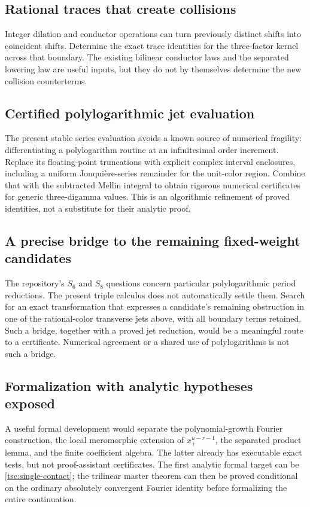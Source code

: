\documentclass[11pt]{article}
\numberwithin{equation}{section}
\theoremstyle{definition}\newtheorem{definition}[theorem]{Definition}
\theoremstyle{remark}\newtheorem{remark}[theorem]{Remark}
\begin{document}
\subsection{Rational traces that create collisions}
Integer dilation and conductor operations can turn previously distinct
shifts into coincident shifts. Determine the exact trace identities for
the three-factor kernel across that boundary. The existing bilinear
conductor laws and the separated lowering law are useful inputs, but they
do not by themselves determine the new collision counterterms.

\subsection{Certified polylogarithmic jet evaluation}
The present stable series evaluation avoids a known source of numerical
fragility: differentiating a polylogarithm routine at an infinitesimal
order increment. Replace its floating-point truncations with explicit
complex interval enclosures, including a uniform Jonqui\`ere-series
remainder for the unit-color region. Combine that with the subtracted
Mellin integral to obtain rigorous numerical certificates for generic
three-digamma values. This is an algorithmic refinement of proved
identities, not a substitute for their analytic proof.

\subsection{A precise bridge to the remaining fixed-weight candidates}
The repository's $S_6$ and $S_8$ questions concern particular polylogarithmic
period reductions. The present triple calculus does not automatically
settle them. Search for an exact transformation that expresses a candidate's
remaining obstruction in one of the rational-color transverse jets above,
with all boundary terms retained. Such a bridge, together with a proved
jet reduction, would be a meaningful route to a certificate. Numerical
agreement or a shared use of polylogarithms is not such a bridge.

\subsection{Formalization with analytic hypotheses exposed}
A useful formal development would separate the polynomial-growth Fourier
construction, the local meromorphic extension of $x_+^{u-r-1}$, the
separated product lemma, and the finite coefficient algebra. The latter
already has executable exact tests, but not proof-assistant certificates.
The first analytic formal target can be
\eqref{tsc:single-contact}; the trilinear master theorem can then be proved
conditional on the ordinary absolutely convergent Fourier identity before
formalizing the entire continuation.
\end{document}
